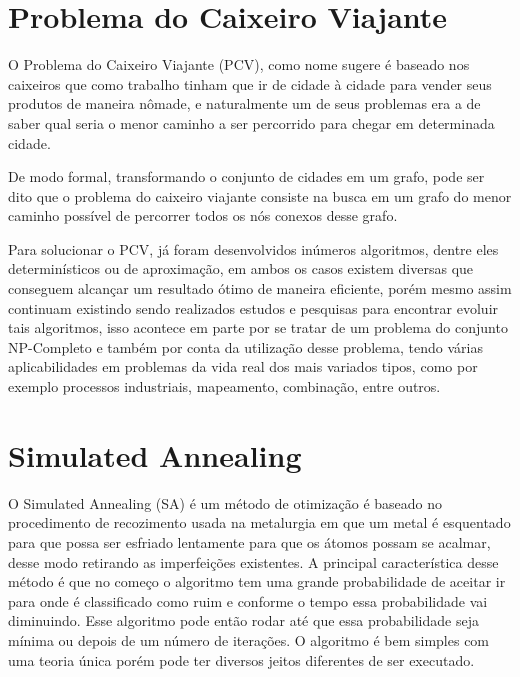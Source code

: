 \documentclass{article}
\begin{document}

    \section{Problema do Caixeiro Viajante}
O Problema do Caixeiro Viajante (PCV), como nome sugere é baseado nos caixeiros que como trabalho tinham que ir de cidade à cidade para vender seus produtos de maneira nômade, e naturalmente um de seus problemas era a de saber qual seria o menor caminho a ser percorrido para chegar em determinada cidade.

De modo formal, transformando o conjunto de cidades em um grafo, pode ser dito que o problema do caixeiro viajante consiste na busca em um grafo do menor caminho possível de percorrer todos os nós conexos desse grafo.
    
Para solucionar o PCV, já foram desenvolvidos inúmeros algoritmos, dentre eles determinísticos ou de aproximação, em ambos os casos existem diversas que conseguem alcançar um resultado ótimo de maneira eficiente, porém mesmo assim continuam existindo sendo realizados estudos e pesquisas para encontrar evoluir tais algoritmos, isso acontece em parte por se tratar de um problema do conjunto NP-Completo e também por conta da utilização desse problema, tendo várias aplicabilidades em problemas da vida real dos mais variados tipos, como por exemplo processos industriais, mapeamento, combinação, entre outros.
    
    \section{Simulated Annealing}
O Simulated Annealing (SA) é um método de otimização é baseado no procedimento de recozimento usada na metalurgia em que um metal é esquentado para que possa ser esfriado lentamente para que os átomos possam se acalmar, desse modo retirando as imperfeições existentes. A principal característica desse método é que no começo o algoritmo tem uma grande probabilidade de aceitar ir para onde é classificado como ruim e conforme o tempo essa probabilidade vai diminuindo. Esse algoritmo pode então rodar até que essa probabilidade seja mínima ou depois de um número de iterações. O algoritmo é bem simples com uma teoria única porém pode ter diversos jeitos diferentes de ser executado.
\end{document}
